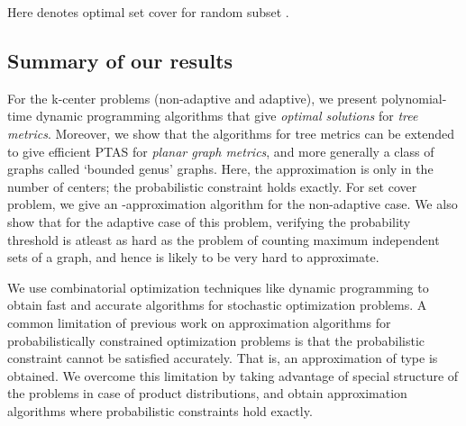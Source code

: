 \documentclass[11pt,onecolumn]{article}
\newcommand{\newtext}[1]{{#1}}
\begin{document}
Here  denotes optimal set cover for random subset .

\subsection{Summary of our results}
For the k-center problems (non-adaptive and adaptive), we present polynomial-time dynamic programming algorithms that give {\it optimal solutions} for {\it tree metrics}. Moreover, we show that the algorithms for tree metrics can be extended to give efficient PTAS for {\it planar graph metrics}, and more generally a class of graphs called `bounded genus' graphs. Here, the approximation is only in the number of centers; the probabilistic constraint holds exactly. For set cover problem, we give an -approximation algorithm for the non-adaptive case. We also show that for the adaptive case of this problem, verifying the probability threshold is atleast as hard as the problem of counting maximum independent sets of a graph, and hence is likely to be very hard to approximate. 

\newtext{We use combinatorial optimization techniques like dynamic programming to obtain fast and accurate algorithms for stochastic optimization problems. A common limitation of previous work \cite{goel99stochastic, swamy-risk-averse} on approximation algorithms for probabilistically constrained optimization problems is that the probabilistic constraint cannot be satisfied accurately. That is, an approximation of type  is obtained. We overcome this limitation by taking advantage of special structure of the problems in case of product distributions, and obtain approximation algorithms where probabilistic constraints hold exactly.}
\end{document}
